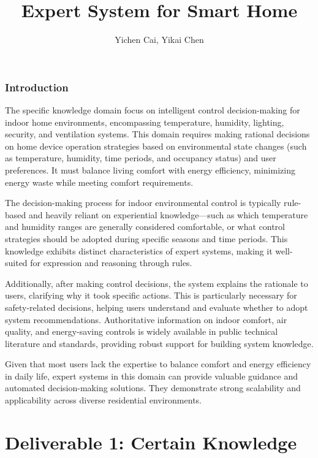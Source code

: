 \documentclass{article}
\title{Expert System for Smart Home}
\author{Yichen Cai, Yikai Chen}
\date{}
\begin{document}
\maketitle

\section{Introduction}

The specific knowledge domain focus on intelligent control decision-making for indoor home environments, encompassing temperature, humidity, lighting, security, and ventilation systems. This domain requires making rational decisions on home device operation strategies based on environmental state changes (such as temperature, humidity, time periods, and occupancy status) and user preferences. It must balance living comfort with energy efficiency, minimizing energy waste while meeting comfort requirements.

The decision-making process for indoor environmental control is typically rule-based and heavily reliant on experiential knowledge—such as which temperature and humidity ranges are generally considered comfortable, or what control strategies should be adopted during specific seasons and time periods. This knowledge exhibits distinct characteristics of expert systems, making it well-suited for expression and reasoning through rules.

Additionally, after making control decisions, the system explains the rationale to users, clarifying why it took specific actions. This is particularly necessary for safety-related decisions, helping users understand and evaluate whether to adopt system recommendations. Authoritative information on indoor comfort, air quality, and energy-saving controls is widely available in public technical literature and standards, providing robust support for building system knowledge.

Given that most users lack the expertise to balance comfort and energy efficiency in daily life, expert systems in this domain can provide valuable guidance and automated decision-making solutions. They demonstrate strong scalability and applicability across diverse residential environments.


\part*{Deliverable 1: Certain Knowledge}
\end{document}
